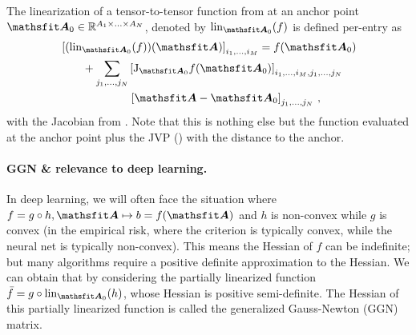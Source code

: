 \begin{definition}\label{def:tensor_linearization}
  The linearization of a tensor-to-tensor function from  at an anchor point $\tA_0 \in \sR^{A_1 \times \ldots \times A_N}$, denoted by $\lin_{\tA_0}(f)$ is defined per-entry as
  \begin{align*}
    & \left[
      (\lin_{\tA_0}(f))(\tA)
      \right]_{i_1, \ldots, i_M} = f(\tA_0)
    \\
    & \hspace{2em}+
      \sum_{j_1, \ldots, j_N}
      \left[
      \jac_{\tA_0}f(\tA_0)
      \right]_{i_1, \ldots, i_M, j_1, \ldots, j_N}
    \\
    & \hspace{6.2em}\left[
      \tA - \tA_0
      \right]_{j_1, \ldots, j_N}\,,
  \end{align*}
  with the Jacobian from . Note that this is nothing else but the function evaluated at the anchor point plus the JVP () with the distance to the anchor.
\end{definition}

\paragraph{GGN \& relevance to deep learning.}
In deep learning, we will often face the situation where $f = g \circ h, \tA \mapsto b = f(\tA)$ and $h$ is non-convex while $g$ is convex
(\eg in the empirical risk, where the criterion is typically convex, while the neural net is typically non-convex).
This means the Hessian of $f$ can be indefinite; but many algorithms require a positive definite approximation to the Hessian.
We can obtain that by considering the partially linearized function $\bar{f} = g \circ \lin_{\tA_0}(h)$, whose Hessian is positive semi-definite.
The Hessian of this partially linearized function is called the generalized Gauss-Newton (GGN) matrix.


